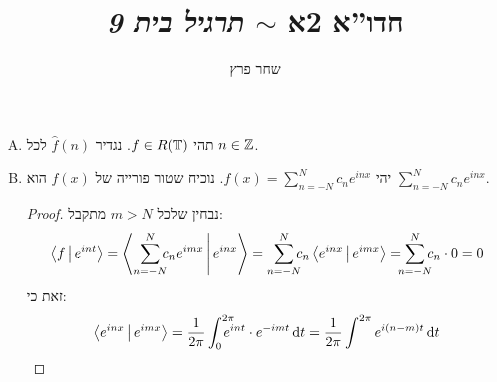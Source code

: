 \documentclass[]{../../../../tex/classes/homework}
\author{שחר פרץ}
\title{חדו''א 2א $\sim$ \textit{תרגיל בית 9}}
\begin{document}
	\maketitle
	\section{}
	\begin{enumerate}[(A)]
		\item תהי $f \in R(\mathbb{T})$. נגדיר $\hat f(n)$ לכל $n \in \mathbb{Z}$. 
		\item יהי $f(x) = \sum_{n = -N}^{N}c_n e^{inx}$. נוכיח שטור פורייה של $f(x)$ הוא $\sum_{n = -N}^{N}c_n e^{inx}$. \begin{proof}
			נבחין שלכל $m > N$ מתקבל: 
			\[ \mut{f}{e^{int}} = \mut{\sum_{n = -N}^{N}\!\!\!c_n e^{imx}}{e^{inx}} = \sum_{n = -N}^{N}\!\!\!c_n\mut{e^{inx}}{e^{imx}} = \sum_{\mathclap{n = -N}}^{N}c_n \cdot 0 = 0 \]
			זאת כי: 
			\[ \left \langle e^{inx} \,\middle|\, e^{imx} \right \rangle = \frac{1}{2\pi}\int^{2\pi}_0 \!\!\!\!\!\! e^{int} \cdot e^{-imt}\,\mathrm{d}t = \frac{1}{2\pi}\int^{2\pi}e^{i(n - m)t}\,\mathrm{d}t \]
		\end{proof}
	\end{enumerate}
	
	
	\ndoc
\end{document}
